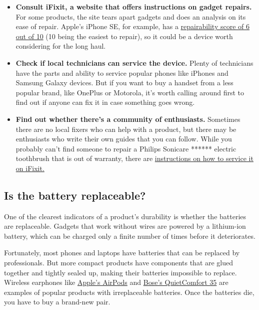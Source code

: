 \begin{itemize}
\item
  \textbf{Consult iFixit, a website that offers instructions on gadget
  repairs.} For some products, the site tears apart gadgets and does an
  analysis on its ease of repair. Apple's iPhone SE, for example, has a
  \href{https://www.ifixit.com/Teardown/iPhone+SE+2020+Teardown/133066}{repairability
  score of 6 out of 10} (10 being the easiest to repair), so it could be
  a device worth considering for the long haul.
\item
  \textbf{Check if local technicians can service the device.} Plenty of
  technicians have the parts and ability to service popular phones like
  iPhones and Samsung Galaxy devices. But if you want to buy a handset
  from a less popular brand, like OnePlus or Motorola, it's worth
  calling around first to find out if anyone can fix it in case
  something goes wrong.
\item
  \textbf{Find out whether there's a community of enthusiasts.}
  Sometimes there are no local fixers who can help with a product, but
  there may be enthusiasts who write their own guides that you can
  follow. While you probably can't find someone to repair a Philips
  Sonicare ****** electric toothbrush that is out of warranty, there are
  \href{https://www.ifixit.com/Guide/How+to+fix+a+Philips+Sonicare+DiamondClean+HX9340+when+it+is+getting+less+powerful+or+has+a+weak+brush./76240}{instructions
  on how to service it on iFixit.}
\end{itemize}

\hypertarget{is-the-battery-replaceable}{%
\subsection{Is the battery
replaceable?}\label{is-the-battery-replaceable}}

One of the clearest indicators of a product's durability is whether the
batteries are replaceable. Gadgets that work without wires are powered
by a lithium-ion battery, which can be charged only a finite number of
times before it deteriorates.

Fortunately, most phones and laptops have batteries that can be replaced
by professionals. But more compact products have components that are
glued together and tightly sealed up, making their batteries impossible
to replace. Wireless earphones like
\href{https://www.nytimes3xbfgragh.onion/2019/04/03/technology/personaltech/apple-airpods-review.html}{Apple's
AirPods} and
\href{https://www.bose.com/en_us/products/headphones/over_ear_headphones/quietcomfort-35-wireless-ii.html\#v=qc35_ii_black}{Bose's
QuietComfort 35} are examples of popular products with irreplaceable
batteries. Once the batteries die, you have to buy a brand-new pair.

